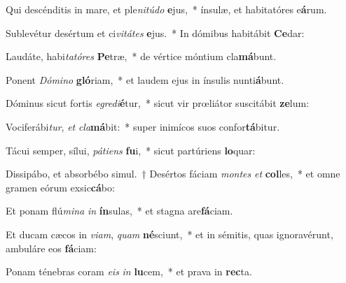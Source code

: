 \item Qui descénditis in mare, et ple\textit{ni}\textit{tú}\textit{do} \textbf{e}jus,~* ínsulæ, et habitatóres e\textbf{á}rum.
\item Sublevétur desértum et ci\textit{vi}\textit{tá}\textit{tes} \textbf{e}jus.~* In dómibus habitábit \textbf{Ce}dar:
\item Laudáte, habi\textit{ta}\textit{tó}\textit{res} \textbf{Pe}træ,~* de vértice móntium cla\textbf{má}bunt.
\item Ponent \textit{Dó}\textit{mi}\textit{no} \textbf{gló}riam,~* et laudem ejus in ínsulis nunti\textbf{á}bunt.
\item Dóminus sicut fortis \textit{e}\textit{gre}\textit{di}\textbf{é}tur,~* sicut vir prœliátor suscitábit \textbf{ze}lum:
\item Vociferábi\textit{tur}, \textit{et} \textit{cla}\textbf{má}bit:~* super inimícos suos confor\textbf{tá}bitur.
\item Tácui semper, sílui, \textit{pá}\textit{ti}\textit{ens} \textbf{fu}i,~* sicut partúriens \textbf{lo}quar:
\item Dissipábo, et absorbébo simul.~† Desértos fáciam \textit{mon}\textit{tes} \textit{et} \textbf{col}les,~* et omne gramen eórum exsic\textbf{cá}bo:
\item Et ponam flú\textit{mi}\textit{na} \textit{in} \textbf{ín}sulas,~* et stagna are\textbf{fá}ciam.
\item Et ducam cæcos in \textit{vi}\textit{am}, \textit{quam} \textbf{né}sciunt,~* et in sémitis, quas ignoravérunt, ambuláre eos \textbf{fá}ciam:
\item Ponam ténebras coram \textit{e}\textit{is} \textit{in} \textbf{lu}cem,~* et prava in \textbf{rec}ta.
